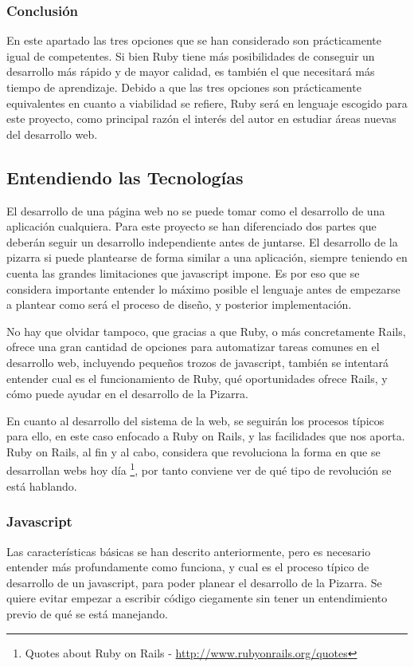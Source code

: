 \subsubsection{Conclusión}
En este apartado las tres opciones que se han considerado son prácticamente igual de competentes. Si bien Ruby tiene más posibilidades de conseguir un desarrollo más rápido y de mayor calidad, es también el que necesitará más tiempo de aprendizaje. Debido a que las tres opciones son prácticamente equivalentes en cuanto a viabilidad se refiere, Ruby será en lenguaje escogido para este proyecto, como principal razón el interés del autor en estudiar áreas nuevas del desarrollo web.

\subsection{Entendiendo las Tecnologías}
El desarrollo de una página web no se puede tomar como el desarrollo de una aplicación cualquiera. Para este proyecto se han diferenciado dos partes que deberán seguir un desarrollo independiente antes de juntarse. El desarrollo de la pizarra si puede plantearse de forma similar a una aplicación, siempre teniendo en cuenta las grandes limitaciones que javascript impone. Es por eso que se considera importante entender lo máximo posible el lenguaje antes de empezarse a plantear como será el proceso de diseño, y posterior implementación.

No hay que olvidar tampoco, que gracias a que Ruby, o más concretamente Rails, ofrece una gran cantidad de opciones para automatizar tareas comunes en el desarrollo web, incluyendo pequeños trozos de javascript, también se intentará entender cual es el funcionamiento de Ruby, qué oportunidades ofrece Rails, y cómo puede ayudar en el desarrollo de la Pizarra.

En cuanto al desarrollo del sistema de la web, se seguirán los procesos típicos para ello, en este caso enfocado a Ruby on Rails, y las facilidades que nos aporta. Ruby on Rails, al fin y al cabo, considera que revoluciona la forma en que se desarrollan webs hoy día \footnote{Quotes about Ruby on Rails - \url{http://www.rubyonrails.org/quotes}}, por tanto conviene ver de qué tipo de revolución se está hablando.

\subsubsection{Javascript}
Las características básicas se han descrito anteriormente, pero es necesario entender más profundamente como funciona, y cual es el proceso típico de desarrollo de un javascript, para poder planear el desarrollo de la Pizarra. Se quiere evitar empezar a escribir código ciegamente sin tener un entendimiento previo de qué se está manejando.


